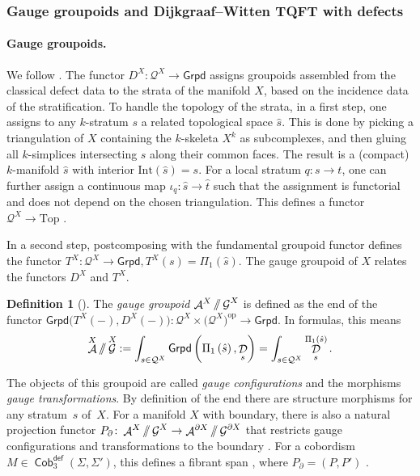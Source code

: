 \documentclass[10pt,a4paper]{amsart}
\DeclareMathOperator{\Cob}{\mathsf{Cob}}
\DeclareMathOperator{\cala}{\mathcal{A}}
\DeclareMathOperator{\cald}{\mathcal{D}}
\DeclareMathOperator{\calg}{\mathcal{G}}
\newcommand{\sslash}{\mathbin{/\mkern-6mu/}}
\numberwithin{equation}{section}
\theoremstyle{definition}
\newtheorem{Definition}[Definition]{Definition}
\begin{document}
\subsubsection{Gauge groupoids and Dijkgraaf--Witten TQFT with defects}
\label{subSecGG}
\paragraph{Gauge groupoids.} We follow \cite[Section~5]{FMM}. The functor $D^X\colon \mathcal{Q}^X \rightarrow \mathsf{Grpd}$ assigns groupoids assembled from the classical defect data to the strata of the manifold $X$, based on the incidence data of the stratification. To handle the topology of the strata, in a first step, one assigns to any $k$-stratum $s$ a related topological space $\hat{s}$. This is done by picking a triangulation of $X$ containing the $k$-skeleta $X^k$ as subcomplexes, and then gluing all $k$-simplices intersecting $s$ along their common faces. The result is a (compact) $k$-manifold $\hat{s}$ with interior $\mathrm{Int}(\hat{s}) = s$. For a local stratum $q\colon s \rightarrow t$, one can further assign a continuous map $\iota_q\colon \hat{s} \rightarrow \hat{t}$ such that the assignment is functorial and does not depend on the chosen triangulation. This defines a functor $\mathcal{Q}^X \rightarrow \mathrm{Top}$ \cite[Proposition 5.1]{FMM}.

In a second step, postcomposing with the fundamental groupoid functor defines the functor $T^X\colon \mathcal{Q}^X \rightarrow \mathsf{Grpd}, T^X(s) = \Pi_1 (\hat{s})$. The gauge groupoid of $X$ relates the functors $D^X$ and $T^X$.

\begin{Definition}[{\cite[Definition 5.7]{FMM}}]
 The \textit{gauge groupoid} $\cala^X \sslash \calg^X$ is defined as the end of the functor $\mathsf{Grpd}\bigl(T^X(-), D^X(-)\bigr)\colon \mathcal{Q}^X \times \bigl(\mathcal{Q}^X\bigr)^{\mathrm{op}} \rightarrow \mathsf{Grpd}$. In formulas, this means
 \begin{align*}
 \cala^X \sslash \calg^X := \int_{s \in \mathcal{Q}^X}\mathsf{Grpd}\left( \Pi_1\left(\hat{s}\right), \cald_s\right) = \int_{s \in \mathcal{Q}^X}\cald_s^{\Pi_1\left(\hat{s}\right)}.
 \end{align*}
\end{Definition}
The objects of this groupoid are called \textit{gauge configurations} and the morphisms \textit{gauge transformations}. By definition of the end there are structure morphisms \smash{$P_s\colon \cala^X \sslash \calg^X \rightarrow \cald_s^{\Pi_1 (\hat{s})}$} for any stratum~$s$ of~$X$. For a manifold $X$ with boundary, there is also a natural projection functor $P_{\partial}\colon \cala^X \sslash \calg^X \rightarrow \cala^{\partial X} \sslash \calg^{\partial X}$ that restricts gauge configurations and transformations to the boundary \cite[Corollary~5.8]{FMM}. For a cobordism $M \in \Cob_3^{\mathsf{def}}(\Sigma, \Sigma')$, this defines a fibrant span \smash{$\cala^{\Sigma} \sslash \calg^{\Sigma} \xleftarrow{P} \cala^M \sslash \calg^M \xrightarrow{P'} \cala^{\Sigma'} \sslash \calg^{\Sigma'}$}, where $P_{\partial} = (P, P')$ \cite[Corollary 5.13]{FMM}.
\end{document}
